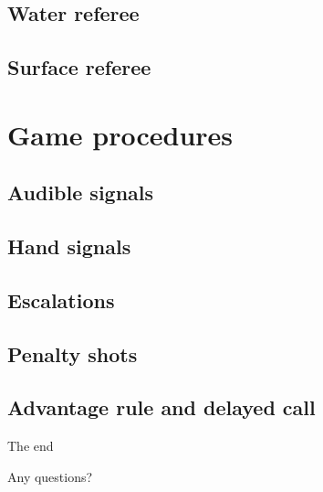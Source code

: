 \documentclass{beamer}
\begin{document}
\subsection{Water referee}



\subsection{Surface referee}



\section{Game procedures}

\subsection{Audible signals}



\subsection{Hand signals}



\subsection{Escalations}



\subsection{Penalty shots}



\subsection{Advantage rule and delayed call}



\begin{frame}{The end}
    \begin{center}
        Any questions?
    \end{center}
\end{frame}
\end{document}
